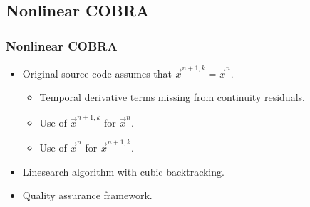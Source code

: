 \documentclass[compress,xcolor=table]{beamer}
\begin{document}
\subsection[COBRA]{Nonlinear COBRA}
\begin{frame}
\frametitle{Nonlinear COBRA}

\begin{itemize}
\item{Original source code assumes that $\vec{x}^{n+1,k} = \vec{x}^{n}$.
    \begin{itemize}
    \item{Temporal derivative terms missing from continuity residuals.}
    \item{Use of $\vec{x}^{n+1,k}$ for $\vec{x}^{n}$.}
    \item{Use of $\vec{x}^{n}$ for $\vec{x}^{n+1,k}$.}
    \end{itemize}
}
\item{Linesearch algorithm with cubic backtracking.}
\item{Quality assurance framework.}
\end{itemize}

\end{frame}
\end{document}
